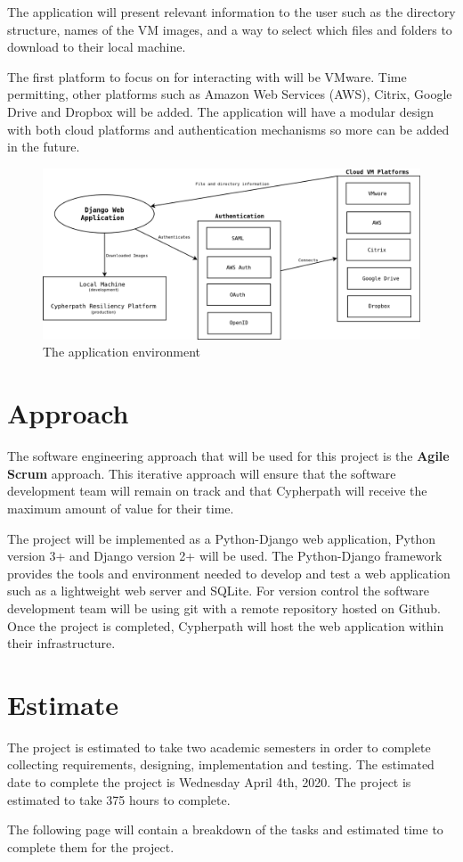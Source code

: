 \documentclass{article}
\begin{document}
    The application will present relevant information to the user such as the directory structure, names of the VM images, and a way to select which files and folders
    to download to their local machine.

    The first platform to focus on for interacting with will be VMware. Time permitting, other platforms such as Amazon Web Services (AWS), Citrix, Google Drive and Dropbox
    will be added. The application will have a modular design with both cloud platforms and authentication mechanisms so more can be added in the future.

    \begin{figure}[h]
    \includegraphics[scale=.4]{downloader_env}
        \caption{The application environment}
    \end{figure}

    \pagebreak
    \section{Approach}
    The software engineering approach that will be used for this project is the \textbf{Agile Scrum} approach.
    This iterative approach will ensure that the software development team will remain on track and that Cypherpath will receive the maximum amount of value
    for their time.

    The project will be implemented as a Python-Django web application, Python version 3+ and Django version 2+ will be used. The Python-Django framework provides the tools 
    and environment needed to develop and test a web application such as a lightweight web server and SQLite. For version control the software development team will be using git
    with a remote repository hosted on Github. Once the project is completed, Cypherpath will host the web application within their infrastructure.

    \section{Estimate}
    The project is estimated to take two academic semesters in order to complete collecting requirements, designing, implementation and testing. The estimated date
    to complete the project is Wednesday April 4th, 2020. The project is estimated to take 375 hours to complete.

    The following page will contain a breakdown of the tasks and estimated time to complete them for the project.
\end{document}

